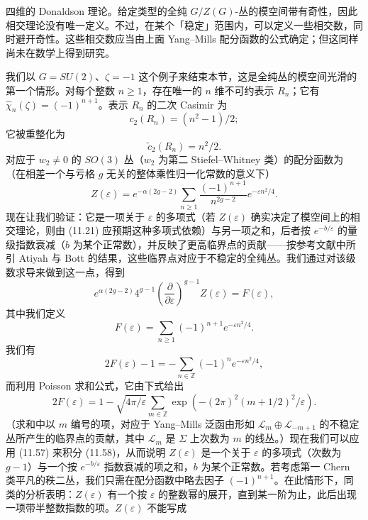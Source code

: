 
四维的 Donaldson 理论。给定类型的全纯 $G/Z(G)$-丛的模空间带有奇性，因此相交理论没有唯一定义。不过，在某个「稳定」范围内，可以定义一些相交数，同时避开奇性。这些相交数应当由上面 Yang--Mills 配分函数的公式确定；但这同样尚未在数学上得到研究。

我们以 $G=SU(2)$、$\zeta=-1$ 这个例子来结束本节，这是全纯丛的模空间光滑的第一个情形。对每个整数 $n\ge1$，存在唯一的 $n$ 维不可约表示 $R_n$；它有 $\hat{\chi}_n(\zeta)=(-1)^{n+1}$。表示 $R_n$ 的二次 Casimir 为
\[
  c_2(R_n)=(n^{2}-1)/2;
\]
它被重整化为
\[
  \tilde{c}_2(R_n)=n^{2}/2.
\]
对应于 $w_2\neq0$ 的 $SO(3)$ 丛（$w_2$ 为第二 Stiefel--Whitney 类）的配分函数为（在相差一个与亏格 $g$ 无关的整体乘性归一化常数的意义下）
\begin{equation}
  \tag{11.56}
  \label{eq:11-56}
  Z(\varepsilon)=e^{-\alpha(2g-2)}\sum_{n\ge1}\frac{(-1)^{n+1}}{n^{2g-2}}e^{-\varepsilon n^{2}/4}.
\end{equation}
现在让我们验证：它是一项关于 $\varepsilon$ 的多项式（若 $Z(\varepsilon)$ 确实决定了模空间上的相交理论，则由 (11.21) 应预期这种多项式依赖）与另一项之和，后者按 $e^{-b/\varepsilon}$ 的量级指数衰减（$b$ 为某个正常数），并反映了更高临界点的贡献——按参考文献中所引 Atiyah 与 Bott 的结果，这些临界点对应于不稳定的全纯丛。我们通过对该级数求导来做到这一点，得到
\begin{equation}
  \tag{11.57}
  \label{eq:11-57}
  e^{\alpha(2g-2)}4^{g-1}\left(\frac{\partial}{\partial\varepsilon}\right)^{g-1}Z(\varepsilon)=F(\varepsilon),
\end{equation}
其中我们定义
\[
  F(\varepsilon)=\sum_{n\ge1}(-1)^{n+1}e^{-\varepsilon n^{2}/4}.
\]
我们有
\[
  2F(\varepsilon)-1=-\sum_{n\in\mathbb{Z}}(-1)^{n}e^{-\varepsilon n^{2}/4},
\]
而利用 Poisson 求和公式，它由下式给出
\begin{equation}
  \tag{11.58}
  \label{eq:11-58}
  2F(\varepsilon)=1-\sqrt{4\pi/\varepsilon}\sum_{m\in\mathbb{Z}}\exp\left(-(2\pi)^{2}(m+1/2)^{2}/\varepsilon\right).
\end{equation}
（求和中以 $m$ 编号的项，对应于 Yang--Mills 泛函由形如 $\mathcal{L}_m\oplus\mathcal{L}_{-m+1}$ 的不稳定丛所产生的临界点的贡献，其中 $\mathcal{L}_m$ 是 $\Sigma$ 上次数为 $m$ 的线丛。）现在我们可以应用 (11.57) 来积分 (11.58)，从而说明 $Z(\varepsilon)$ 是一个关于 $\varepsilon$ 的多项式（次数为 $g-1$）与一个按 $e^{-b/\varepsilon}$ 指数衰减的项之和，$b$ 为某个正常数。若考虑第一 Chern 类平凡的秩二丛，我们只需在配分函数中略去因子 $(-1)^{n+1}$。在此情形下，同类的分析表明：$Z(\varepsilon)$ 有一个按 $\varepsilon$ 的整数幂的展开，直到某一阶为止，此后出现一项带半整数指数的项。$Z(\varepsilon)$ 不能写成

